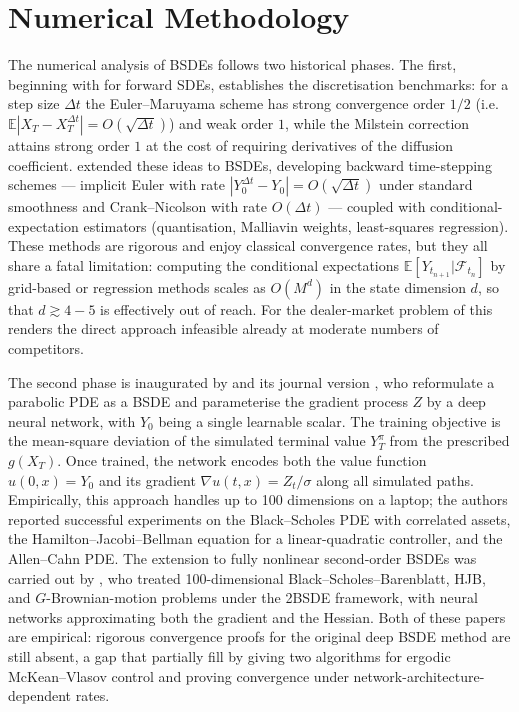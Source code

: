 \section{Numerical Methodology}\label{sec:lit-num}

The numerical analysis of BSDEs follows two historical phases.
The first, beginning with \citet{kloeden1992, kloeden1994} for
forward SDEs, establishes the discretisation benchmarks: for a
step size $\Delta t$ the Euler--Maruyama scheme has strong
convergence order $1/2$ (i.e.\
$\mathbb{E}|X_T - X_T^{\Delta t}| = O(\sqrt{\Delta t})$) and weak
order $1$, while the Milstein correction attains strong order $1$
at the cost of requiring derivatives of the diffusion
coefficient.  \citet{pengxu2011} extended these ideas to BSDEs,
developing backward time-stepping schemes --- implicit Euler with
rate $|Y_0^{\Delta t} - Y_0| = O(\sqrt{\Delta t})$ under standard
smoothness and Crank--Nicolson with rate $O(\Delta t)$ --- coupled
with conditional-expectation estimators (quantisation, Malliavin
weights, least-squares regression).  These methods are rigorous
and enjoy classical convergence rates, but they all share a
fatal limitation: computing the conditional expectations
$\mathbb{E}[Y_{t_{n+1}} | \mathcal{F}_{t_n}]$ by grid-based or
regression methods scales as $O(M^d)$ in the state dimension $d$,
so that $d \gtrsim 4{-}5$ is effectively out of reach.  For the
dealer-market problem of \citet{cont2024} this renders the
direct approach infeasible already at moderate numbers of
competitors.

The second phase is inaugurated by \citet{ehanjentzen2017} and its
journal version \citet{han2018}, who reformulate
a parabolic PDE as a BSDE and parameterise the gradient process $Z$ by
a deep neural network, with $Y_0$ being a single learnable scalar.
The training objective is the mean-square deviation of the simulated
terminal value $Y_T^\pi$ from the prescribed $g(X_T)$.  Once trained,
the network encodes both the value function $u(0, x) = Y_0$ and its
gradient $\nabla u(t, x) = Z_t/\sigma$ along all simulated paths.
Empirically, this approach handles up to 100 dimensions on a laptop;
the authors reported successful experiments on the Black--Scholes
PDE with correlated assets, the Hamilton--Jacobi--Bellman equation
for a linear-quadratic controller, and the Allen--Cahn PDE.  The
extension to fully nonlinear second-order BSDEs was carried out by
\citet{beck2019}, who treated 100-dimensional
Black--Scholes--Barenblatt, HJB, and $G$-Brownian-motion problems
under the 2BSDE framework, with neural networks approximating both
the gradient and the Hessian.  Both of these papers are empirical:
rigorous convergence proofs for the original deep BSDE method are
still absent, a gap that \citet{carmona2019} partially
fill by giving two algorithms for ergodic McKean--Vlasov control
and proving convergence under network-architecture-dependent rates.

